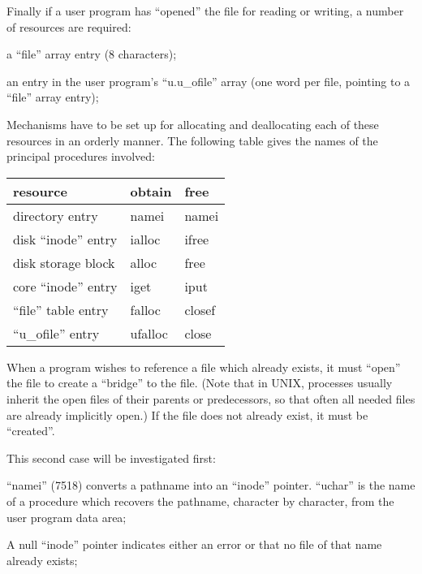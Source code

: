 \noindent Finally if a user program has ``opened''
the file for reading or writing, a
number of resources are required:

\bd
\item[(e)] a ``file'' array entry (8 characters);

\item[(f)] an entry in the user program's
``u.u\_ofile'' array (one word per
file, pointing to a ``file'' array
entry);
\ed


Mechanisms have to be set up for allocating and deallocating each of these
resources in an orderly manner. The
following table gives the names of the
principal procedures involved:

\begin{center}
\begin{tabular}{lll}
{\bf resource} & {\bf obtain} & {\bf free} \\ \hline
directory entry & namei & namei\\
disk ``inode'' entry & ialloc & ifree\\
disk storage block & alloc & free\\
core ``inode'' entry & iget & iput\\
``file'' table entry & falloc & closef\\
``u\_ofile'' entry & ufalloc & close\\
\end{tabular}
\end{center}


When a program wishes to reference a
file which already exists, it must
``open'' the file to create a ``bridge'' to
the file. (Note that in UNIX,
processes usually inherit the open
files of their parents or predecessors,
so that often all needed files are
already implicitly open.) If the file
does not already exist, it must be
``created''.


This second case will be investigated
first:



\bd
\item[5786:] ``namei'' (7518) converts a pathname into an ``inode'' pointer.
 ``uchar'' is the name of a procedure which recovers the pathname, character by character,
 from the user program data area;

\item[5787:] A null ``inode'' pointer indicates
 either an error or that no file
 of that name already exists;

